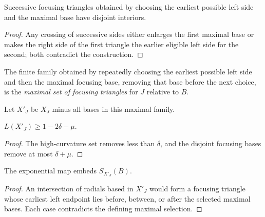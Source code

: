 \begin{claim}
\label{claim:maximal-focusing-triangles-disjoint}
Successive focusing triangles obtained by choosing the earliest possible left
side and the maximal base have disjoint interiors.
\end{claim}
\begin{proof}
\sketch Any crossing of successive sides either enlarges the first maximal base
or makes the right side of the first triangle the earlier eligible left side
for the second; both contradict the construction.
\end{proof}

\begin{definition}
\label{def:maximal-focusing-triangle-set}
The finite family obtained by repeatedly choosing the earliest possible left
side and then the maximal focusing base, removing that base before the next
choice, is the \emph{maximal set of focusing triangles} for $J$ relative to
$B$.
\end{definition}

Let $X'_J$ be $X_J$ minus all bases in this maximal family.

\begin{claim}
\label{claim:remaining-set-length-bound}
$L(X'_J)\ge1-2\delta-\mu$.
\end{claim}
\begin{proof}
\sketch The high-curvature set removes less than $\delta$, and the disjoint focusing
bases remove at most $\delta+\mu$.
\end{proof}

\begin{claim}
\label{claim:exponential-map-embedding-on-remainder}
The exponential map embeds $S_{X'_J}(B)$.
\end{claim}
\begin{proof}
\sketch An intersection of radials based in $X'_J$ would form a focusing
triangle whose earliest left endpoint lies before, between, or after the
selected maximal bases. Each case contradicts the defining maximal selection.
\end{proof}

